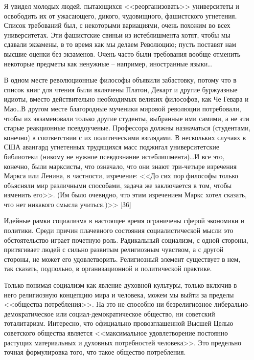 \documentclass{book}
\begin{document}
Я увидел молодых людей, пытающихся <<реорганизовать>> университеты и освободить их от ужасающего, дикого, чудо­вищного, фашистского угнетения. Список требований был, с некоторыми вариациями, очень похожим во всех университе­тах. Эти фашистские свиньи из истеблишмента хотят, чтобы мы сдавали экзамены, в то время как мы делаем Революцию; пусть поставят нам высшие оценки без экзаменов. Очень час­то были требования вообще отменить некоторые предметы как ненужные -- например, иностранные языки\ldots

В одном месте революционные философы объявили заба­стовку, потому что в список книг для чтения были включены Платон, Декарт и другие буржуазные идиоты, вместо действи­тельно необходимых великих философов, как Че Гевара и Мао\ldots В другом месте благородные мученики мировой революции по­требовали, чтобы их экзаменовали только другие студенты, вы­бранные ими самими, а не эти старые реакционные псевдо­ученые. Профессора должны назначаться (студентами, конеч­но) в соответствии с их политическими взглядами. В несколь­ких случаях в США авангард угнетенных трудящихся масс поджигал университетские библиотеки (никому не нужное псевдознание истеблишмента)\ldots И все это, конечно, были марк­систы, что означало, что они знают три-четыре изречения Маркса или Ленина, в частности, изречение: <<До сих пор философы только объясняли мир различными способами, задача же заклю­чается в том, чтобы изменить его>>. (Им было очевидно, что этим изречением Маркс хотел сказать, что нет никакого смысла учиться.)>> [36]

Идейные рамки социализма в настоящее время ограничены сферой экономики и политики. Среди причин плачевного состояния социалистической мысли это обстоятельство играет почетную роль. Радикальный социализм, с одной стороны, притягивает людей с сильно развитым религиозным чувством, а с другой стороны, не может его удовлетворить. Религиозный элемент существует в нем, так сказать, подпольно, в организационной и политической практике.

Только понимая социализм как явление духовной культуры, только включив в него религиозную концепцию мира и человека, можем мы выйти за пределы <<общества потребления>>. На это не способно ни безрелигиозное либерально-демократическое или социал-демократическое общество, ни советский тоталитаризм. Интересно, что официально провозглашенной Высшей Целью советского общества является <<максимальное удовлетворение постоянно растущих материальных и духовных потребностей человека>>. Это предельно точная формулировка того, что такое общество потребления.
\end{document}

